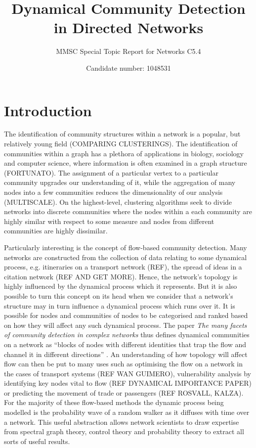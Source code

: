\documentclass[12pt,a4paper]{article}
\title{Dynamical Community Detection in Directed Networks}
\author{MMSC Special Topic Report for Networks C5.4}
\date{Candidate number: 1048531}
\begin{document}
\maketitle
\thispagestyle{empty}
\newpage
\setcounter{page}{1}

\section{Introduction}

The identification of community structures within a network is a popular, but relatively young field (COMPARING CLUSTERINGS). The identification of communities within a graph has a plethora of applications in biology, sociology and computer science, where information is often examined in a graph structure (FORTUNATO). The assignment of a particular vertex to a particular community upgrades our understanding of it, while the aggregation of many nodes into a few communities reduces the dimensionality of our analysis (MULTISCALE). On the highest-level, clustering algorithms seek to divide networks into discrete communities where the nodes within a each community are highly similar with respect to some measure and nodes from different communities are highly dissimilar. \medskip

\noindent Particularly interesting is the concept of flow-based community detection. Many networks are constructed from the collection of data relating to some dynamical process, e.g. itineraries on a transport network (REF), the spread of ideas in a citation network (REF AND GET MORE). Hence, the network's topology is highly influenced by the dynamical process which it represents. But it is also possible to turn this concept on its head when we consider that a network's structure may in turn influence a dynamical process which runs over it. It is possible for nodes and communities of nodes to be categorised and ranked based on how they will affect any such dynamical process. The paper \textit{The many facets of community detection in complex networks} thus defines dynamical communities on a network as ``blocks of nodes with different identities that trap the flow and channel it in different directions'' \cite{schaub2017many}. An understanding of how topology will affect flow can then be put to many uses such as optimising the flow on a network in the cases of transport systems (REF WAN GUIMERO), vulnerability analysis by identifying key nodes vital to flow (REF DYNAMICAL IMPORTANCE PAPER) or predicting the movement of trade or passengers (REF ROSVALL, KALZA). For the majority of these flow-based methods the dynamic process being modelled is the probability wave of a random walker as it diffuses with time over a network. This useful abstraction allows network scientists to draw expertise from spectral graph theory, control theory and probability theory to extract all sorts of useful results. \medskip
\end{document}
